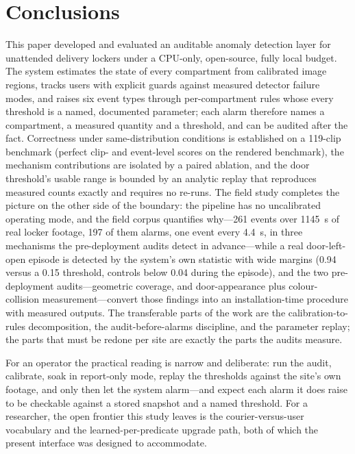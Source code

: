 \documentclass[journal,article,submit,oneauthor]{Definitions/mdpi}
\begin{document}
\section{Conclusions}
\label{sec:conclusions}
This paper developed and evaluated an auditable anomaly detection layer for unattended
delivery lockers under a CPU-only, open-source, fully local budget. The system estimates
the state of every compartment from calibrated image regions, tracks users with explicit
guards against measured detector failure modes, and raises six event types through
per-compartment rules whose every threshold is a named, documented parameter; each alarm
therefore names a compartment, a measured quantity and a threshold, and can be audited
after the fact. Correctness under same-distribution conditions is established on a
119-clip benchmark (perfect clip- and event-level scores on the rendered benchmark), the
mechanism contributions are isolated
by a paired ablation, and the door threshold's usable range is bounded by an analytic
replay that reproduces measured counts exactly and requires no re-runs. The field study
completes the picture on the other side of the boundary: the pipeline has no uncalibrated
operating mode, and the field corpus quantifies why---261 events over 1145~s of real
locker footage, 197 of them alarms, one event every 4.4~s, in three mechanisms the
pre-deployment audits detect in advance---while a real door-left-open episode is
detected by the system's own statistic
with wide margins (0.94 versus a 0.15 threshold, controls below 0.04 during the episode), and the two
pre-deployment audits---geometric coverage, and door-appearance plus colour-collision
measurement---convert those findings into an installation-time procedure with measured
outputs. The transferable parts of the work are the calibration-to-rules decomposition, the
audit-before-alarms discipline, and the parameter replay; the parts that must be redone
per site are exactly the parts the audits measure.

For an operator the practical reading is narrow and deliberate: run the audit, calibrate,
soak in report-only mode, replay the thresholds against the site's own footage, and only
then let the system alarm---and expect each alarm it does raise to be checkable against a
stored snapshot and a named threshold. For a researcher, the open frontier this study
leaves is the courier-versus-user vocabulary and the learned-per-predicate upgrade path,
both of which the present interface was designed to accommodate.
\end{document}

